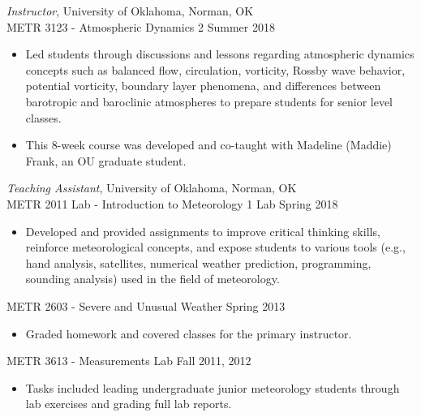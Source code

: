\documentclass[10pt]{res} %
\begin{document}
\begin{resume}
{\sl Instructor}, University of Oklahoma, Norman, OK \\
METR 3123 - Atmospheric Dynamics 2 \hfill Summer 2018
\begin{itemize} \itemsep 2pt %
\item Led students through discussions and lessons regarding atmospheric dynamics concepts such as balanced flow, circulation, vorticity, Rossby wave behavior, potential vorticity, boundary layer phenomena, and differences between barotropic and baroclinic atmospheres to prepare students for senior level classes.
\item This 8-week course was developed and co-taught with Madeline (Maddie) Frank, an OU graduate student.
\end{itemize}

{\sl Teaching Assistant}, University of Oklahoma, Norman, OK \\
METR 2011 Lab - Introduction to Meteorology 1 Lab \hfill Spring 2018
\begin{itemize} \itemsep 2pt %
\item Developed and provided assignments to improve critical thinking skills, reinforce meteorological concepts, and expose students to various tools (e.g., hand analysis, satellites, numerical weather prediction, programming, sounding analysis) used in the field of meteorology.  
\end{itemize}

METR 2603 - Severe and Unusual Weather \hfill Spring 2013
\begin{itemize} \itemsep 2pt %
\item Graded homework and covered classes for the primary instructor.
\end{itemize}

METR 3613 - Measurements Lab \hfill Fall 2011, 2012 
\begin{itemize} \itemsep 2pt %
\item Tasks included leading undergraduate junior meteorology students through lab exercises and grading full lab reports.  
\end{itemize}


\end{resume}
\end{document}
